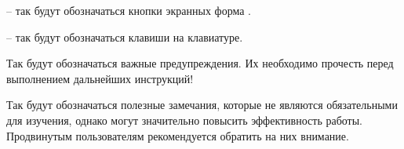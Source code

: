   -- так будут обозначаться кнопки экранных форма \tmis.
 
  -- так будут обозначаться клавиши на клавиатуре.
 
 \begin{vnim}
  Так будут обозначаться важные предупреждения. Их необходимо прочесть перед выполнением дальнейших инструкций!
 \end{vnim}
 
 \begin{prim}
 Так будут обозначаться полезные замечания, которые не являются обязательными для изучения, однако могут значительно повысить эффективность работы. Продвинутым пользователям рекомендуется обратить на них внимание.
 \end{prim}
